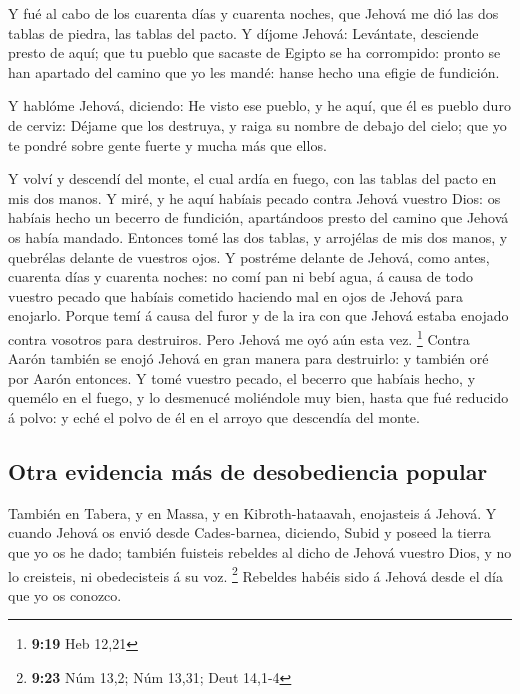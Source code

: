  Y fué al cabo de los cuarenta días y cuarenta noches, que
Jehová me dió las dos tablas de piedra, las tablas del pacto.
 Y díjome Jehová: Levántate, desciende presto de aquí; que
tu pueblo que sacaste de Egipto se ha corrompido: pronto se han apartado
del camino que yo les mandé: hanse hecho una efigie de fundición.

 Y hablóme Jehová, diciendo: He visto ese pueblo, y he
aquí, que él es pueblo duro de cerviz:  Déjame que los
destruya, y raiga su nombre de debajo del cielo; que yo te pondré sobre
gente fuerte y mucha más que ellos.

 Y volví y descendí del monte, el cual ardía en fuego, con
las tablas del pacto en mis dos manos.  Y miré, y he aquí
habíais pecado contra Jehová vuestro Dios: os habíais hecho un becerro
de fundición, apartándoos presto del camino que Jehová os había mandado.
 Entonces tomé las dos tablas, y arrojélas de mis dos
manos, y quebrélas delante de vuestros ojos.  Y postréme
delante de Jehová, como antes, cuarenta días y cuarenta noches: no comí
pan ni bebí agua, á causa de todo vuestro pecado que habíais cometido
haciendo mal en ojos de Jehová para enojarlo.  Porque temí
á causa del furor y de la ira con que Jehová estaba enojado contra
vosotros para destruiros. Pero Jehová me oyó aún esta vez. \footnote{\textbf{9:19}
  Heb 12,21}  Contra Aarón también se enojó Jehová en gran
manera para destruirlo: y también oré por Aarón entonces. 
Y tomé vuestro pecado, el becerro que habíais hecho, y quemélo en el
fuego, y lo desmenucé moliéndole muy bien, hasta que fué reducido á
polvo: y eché el polvo de él en el arroyo que descendía del monte.

\hypertarget{otra-evidencia-muxe1s-de-desobediencia-popular}{%
\subsection{Otra evidencia más de desobediencia
popular}\label{otra-evidencia-muxe1s-de-desobediencia-popular}}

 También en Tabera, y en Massa, y en Kibroth-hataavah,
enojasteis á Jehová.  Y cuando Jehová os envió desde
Cades-barnea, diciendo, Subid y poseed la tierra que yo os he dado;
también fuisteis rebeldes al dicho de Jehová vuestro Dios, y no lo
creisteis, ni obedecisteis á su voz. \footnote{\textbf{9:23} Núm 13,2;
  Núm 13,31; Deut 14,1-4}  Rebeldes habéis sido á Jehová
desde el día que yo os conozco.

